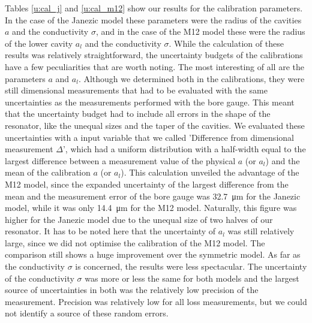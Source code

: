Tables \ref{u:cal_j} and \ref{u:cal_m12} show our results for the calibration parameters. In the case of the Janezic model these parameters were the radius of the cavities $a$ and the conductivity $\sigma$, and in the case of the M12 model these were the radius of the lower cavity $a_l$ and the conductivity $\sigma$.  While the calculation of these results was relatively straightforward, the uncertainty budgets of the calibrations have a few peculiarities that are worth noting. The most interesting of all are the parameters $a$ and $a_l$. Although we determined both in the calibrations, they were still dimensional measurements that had to be evaluated with the same uncertainties as the measurements performed with the bore gauge. This meant that the uncertainty budget had to include all errors in the shape of the resonator, like the unequal sizes and the taper of the cavities. We evaluated these uncertainties with a input variable that we called 'Difference from dimensional measurement $\Delta$', which had a uniform distribution with a half-width equal to the largest difference between a measurement value of the physical $a$ (or $a_l$) and the mean of the calibration $a$ (or $a_l$). This calculation unveiled the advantage of the M12 model, since the expanded uncertainty of the largest difference from the mean and the measurement error of the bore gauge was \SI{32.7}{\micro\meter} for the Janezic model, while it was only \SI{14.4}{\micro\meter} for the M12 model. Naturally, this figure was higher for the Janezic model due to the unequal size of two halves of our resonator. It has to be noted here that the uncertainty of $a_l$ was still relatively large, since we did not optimise the calibration of the M12 model. The comparison still shows a huge improvement over the symmetric model. As far as the conductivity $\sigma$ is concerned, the results were less spectacular. The uncertainty of the conductivity $\sigma$ was more or less the same for both models and the largest source of uncertainties in both was the relatively low precision of the measurement. Precision was relatively low for all loss measurements, but we could not identify a source of these random errors.

